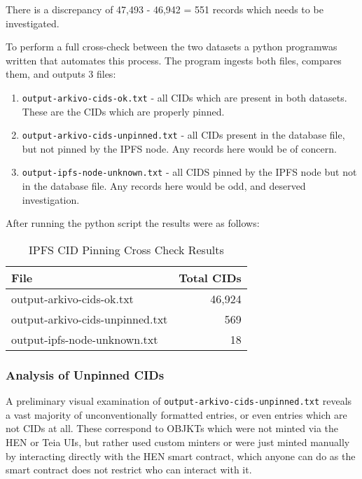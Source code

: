 There is a discrepancy of 47,493 - 46,942 = 551 records which needs to be investigated.

To perform a full cross-check between the two datasets a python program\footnotemark[3] was written that automates this process. The program ingests both files, compares them, and outputs 3 files:


\begin{enumerate}
    \item \texttt{output-arkivo-cids-ok.txt} - all CIDs which are present in both datasets. These are the CIDs which are properly pinned.
    \item \texttt{output-arkivo-cids-unpinned.txt} - all CIDs present in the database file, but not pinned by the IPFS node. Any records here would be of concern.
    \item \texttt{output-ipfs-node-unknown.txt} - all CIDS pinned by the IPFS node but not in the database file. Any records here would be odd, and deserved investigation.
\end{enumerate}

After running the python script the results were as follows:


\begin{table}[h]
\footnotesize
\centering
\begin{tabular}{|l|r|}
\hline
\textbf{File} & \textbf{Total CIDs} \\ \hline
output-arkivo-cids-ok.txt                 & 46,924                         \\ \hline
output-arkivo-cids-unpinned.txt             & 569                         \\ \hline
output-ipfs-node-unknown.txt       & 18               \\ \hline
\end{tabular}
\caption{IPFS CID Pinning Cross Check Results}
\label{table:cross-check-results}
\end{table}

\subsubsection{Analysis of Unpinned CIDs}

A preliminary visual examination of \texttt{output-arkivo-cids-unpinned.txt} reveals a vast majority of unconventionally formatted entries, or even entries which are not CIDs at all. These correspond to OBJKTs which were not minted via the HEN or Teia UIs, but rather used custom minters or were just minted manually by interacting directly with the HEN smart contract, which anyone can do as the smart contract does not restrict who can interact with it.

